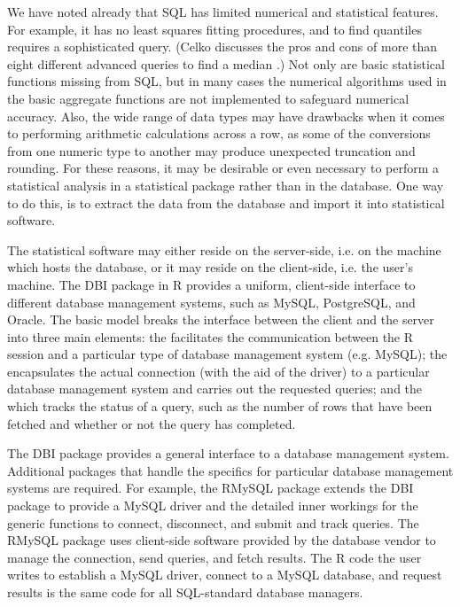 We have noted already that SQL has limited numerical and statistical features. 
For example, it has no least squares fitting procedures,
and to find quantiles requires a sophisticated query.
(Celko discusses the pros and cons of more than eight 
different advanced queries to find a median \cite{Celko}.) 
Not only are basic statistical functions missing from SQL,
but in many cases the numerical algorithms used in the basic 
aggregate functions are not implemented to safeguard numerical accuracy.
Also, the wide range of data types may have drawbacks
when it comes to performing arithmetic calculations across
a row, as some of the conversions from one numeric type to
another may produce unexpected truncation and rounding. 
For these reasons, it may be desirable or even necessary to perform
a statistical analysis in a statistical package 
rather than in the database.
One way to do this, is to extract the data from the database 
and import it into statistical software.

The statistical software may either reside on the server-side,
i.e. on the machine which hosts the database, or it may
reside on the client-side, i.e. the user's machine. 
The DBI package in R provides a uniform, client-side interface to 
different database management systems, such as MySQL, PostgreSQL, 
and Oracle.
The basic model breaks the interface between the client and the server 
into three main elements: 
the  facilitates the communication between the R session
and a particular type of database management system (e.g. MySQL);
the  encapsulates the actual connection 
(with the aid of the driver) to a particular database management system
and carries out the requested queries;
and the  which tracks the status of a query, such
as the number of rows that have been fetched and whether or not 
the query has completed.

The DBI package provides a general interface to a database
management system. 
Additional packages that handle the specifics for particular 
database management systems are required.
For example, the RMySQL package extends the DBI package to provide 
a MySQL driver and 
the detailed inner workings for the generic functions to connect,
disconnect, and submit and track queries.
The RMySQL package uses client-side software provided by the database vendor
to manage the connection, send queries, and fetch results.
The R code the user writes to establish a MySQL driver, connect to a 
MySQL database, and request results is the same code for all SQL-standard 
database managers.

